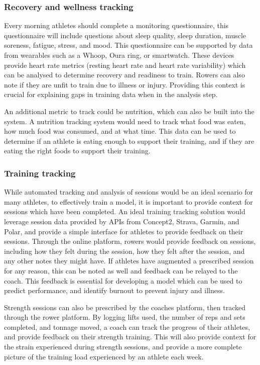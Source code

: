 \subsubsection{Recovery and wellness tracking}
Every morning athletes should complete a monitoring questionnaire, this questionnaire will include questions about sleep quality, sleep duration, muscle soreness, fatigue, stress, and mood. This questionnaire can be supported by data from wearables such as a Whoop, Oura ring, or smartwatch. These devices provide heart rate metrics (resting heart rate and heart rate variability) which can be analysed to determine recovery and readiness to train. Rowers can also note if they are unfit to train due to illness or injury. Providing this context is crucial for explaining gaps in training data when in the analysis step.

An additional metric to track could be nutrition, which can also be built into the system. A nutrition tracking system would need to track what food was eaten, how much food was consumed, and at what time. This data can be used to determine if an athlete is eating enough to support their training, and if they are eating the right foods to support their training.

\subsubsection{Training tracking}
While automated tracking and analysis of sessions would be an ideal scenario for many athletes, to effectively train a model, it is important to provide context for sessions which have been completed. An ideal training tracking solution would leverage session data provided by APIs from Concept2, Strava, Garmin, and Polar, and provide a simple interface for athletes to provide feedback on their sessions. Through the online platform, rowers would provide feedback on sessions, including how they felt during the session, how they felt after the session, and any other notes they might have. If athletes have augmented a prescribed session for any reason, this can be noted as well and feedback can be relayed to the coach. This feedback is essential for developing a model which can be used to predict performance, and identify burnout to prevent injury and illness.

Strength sessions can also be prescribed by the coaches platform, then tracked through the rower platform. By logging lifts used, the number of reps and sets completed, and tonnage moved, a coach can track the progress of their athletes, and provide feedback on their strength training. This will also provide context for the strain experienced during strength sessions, and provide a more complete picture of the training load experienced by an athlete each week.

